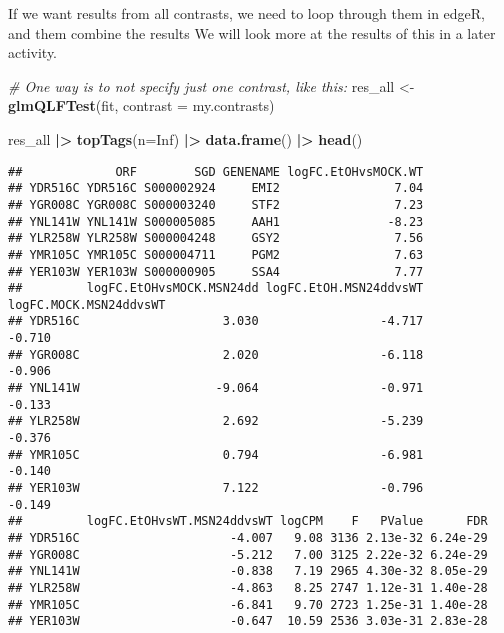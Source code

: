 \documentclass[
]{book}
\newenvironment{Shaded}{\begin{snugshade}}{\end{snugshade}}
\newcommand{\AttributeTok}[1]{\textcolor[rgb]{0.13,0.29,0.53}{#1}}
\newcommand{\CommentTok}[1]{\textcolor[rgb]{0.56,0.35,0.01}{\textit{#1}}}
\newcommand{\ConstantTok}[1]{\textcolor[rgb]{0.56,0.35,0.01}{#1}}
\newcommand{\FunctionTok}[1]{\textcolor[rgb]{0.13,0.29,0.53}{\textbf{#1}}}
\newcommand{\NormalTok}[1]{#1}
\newcommand{\OtherTok}[1]{\textcolor[rgb]{0.56,0.35,0.01}{#1}}
\newcommand{\SpecialCharTok}[1]{\textcolor[rgb]{0.81,0.36,0.00}{\textbf{#1}}}
\begin{document}
If we want results from all contrasts, we need to loop through them in edgeR, and them combine the results We will look more at the results of this in a later activity.

\begin{Shaded}
\begin{Highlighting}[]
\CommentTok{\# One way is to not specify just one contrast, like this:}
\NormalTok{res\_all }\OtherTok{\textless{}{-}} \FunctionTok{glmQLFTest}\NormalTok{(fit, }\AttributeTok{contrast =}\NormalTok{ my.contrasts)}

\NormalTok{res\_all }\SpecialCharTok{|\textgreater{}} 
  \FunctionTok{topTags}\NormalTok{(}\AttributeTok{n=}\ConstantTok{Inf}\NormalTok{) }\SpecialCharTok{|\textgreater{}} 
  \FunctionTok{data.frame}\NormalTok{() }\SpecialCharTok{|\textgreater{}}
  \FunctionTok{head}\NormalTok{()}
\end{Highlighting}
\end{Shaded}

\begin{verbatim}
##             ORF        SGD GENENAME logFC.EtOHvsMOCK.WT
## YDR516C YDR516C S000002924     EMI2                7.04
## YGR008C YGR008C S000003240     STF2                7.23
## YNL141W YNL141W S000005085     AAH1               -8.23
## YLR258W YLR258W S000004248     GSY2                7.56
## YMR105C YMR105C S000004711     PGM2                7.63
## YER103W YER103W S000000905     SSA4                7.77
##         logFC.EtOHvsMOCK.MSN24dd logFC.EtOH.MSN24ddvsWT logFC.MOCK.MSN24ddvsWT
## YDR516C                    3.030                 -4.717                 -0.710
## YGR008C                    2.020                 -6.118                 -0.906
## YNL141W                   -9.064                 -0.971                 -0.133
## YLR258W                    2.692                 -5.239                 -0.376
## YMR105C                    0.794                 -6.981                 -0.140
## YER103W                    7.122                 -0.796                 -0.149
##         logFC.EtOHvsWT.MSN24ddvsWT logCPM    F   PValue      FDR
## YDR516C                     -4.007   9.08 3136 2.13e-32 6.24e-29
## YGR008C                     -5.212   7.00 3125 2.22e-32 6.24e-29
## YNL141W                     -0.838   7.19 2965 4.30e-32 8.05e-29
## YLR258W                     -4.863   8.25 2747 1.12e-31 1.40e-28
## YMR105C                     -6.841   9.70 2723 1.25e-31 1.40e-28
## YER103W                     -0.647  10.59 2536 3.03e-31 2.83e-28
\end{verbatim}
\end{document}
